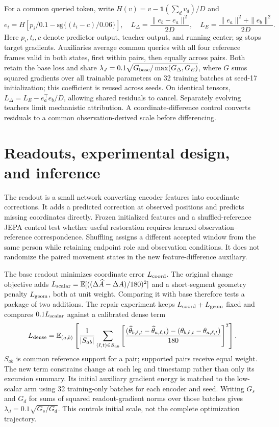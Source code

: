 \documentclass{article}
\begin{document}
For a common queried token, write $H(v)=v-\mathbf1(\sum_d v_d)/D$ and
\begin{equation}
e_i=H\left[p_i/0.1-\mathrm{sg}\{(t_i-c)/0.06\}\right],\quad
L_\Delta=\frac{\|e_b-e_a\|^2}{2D},\quad
L_E=\frac{\|e_a\|^2+\|e_b\|^2}{2D}.
\label{eq:feature}
\end{equation}
Here $p_i,t_i,c$ denote predictor output, teacher output, and running center; $\mathrm{sg}$ stops target gradients. Auxiliaries average common queries with all four reference frames valid in both states, first within pairs, then equally across pairs. Both retain the base loss and share $\lambda_J=0.1\sqrt{G_{\rm base}/\max(G_\Delta,G_E)}$, where $G$ sums squared gradients over all trainable parameters on 32 training batches at seed-17 initialization; this coefficient is reused across seeds. On identical tensors, $L_\Delta=L_E-e_a^\top e_b/D$, allowing shared residuals to cancel. Separately evolving teachers limit mechanistic attribution. A coordinate-difference control converts residuals to a common observation-derived scale before differencing.

\clearpage
\section{Readouts, experimental design, and inference}
The readout is a small network converting encoder features into coordinate corrections. It adds a predicted correction at observed positions and predicts missing coordinates directly. Frozen initialized features and a shuffled-reference JEPA control test whether useful restoration requires learned observation--reference correspondence. Shuffling assigns a different accepted window from the same person while retaining endpoint role and observation conditions. It does not randomize the paired movement states in the new feature-difference auxiliary.

The base readout minimizes coordinate error $L_{\rm coord}$. The original change objective adds $L_{\rm scalar}=\mathbb E[((\Delta\widehat A-\Delta A)/180)^2]$ and a short-segment geometry penalty $L_{\rm geom}$, both at unit weight. Comparing it with base therefore tests a package of two additions. The repair experiment keeps $L_{\rm coord}+L_{\rm geom}$ fixed and compares $0.1L_{\rm scalar}$ against a calibrated dense term
\begin{equation}
L_{\rm dense}=\mathbb E_{(a,b)}\left[\frac{1}{|S_{ab}|}\sum_{(\ell,t)\in S_{ab}}
\left[\frac{(\widehat\theta_{b,\ell,t}-\widehat\theta_{a,\ell,t})-(\theta_{b,\ell,t}-\theta_{a,\ell,t})}{180}\right]^2\right].
\end{equation}
$S_{ab}$ is common reference support for a pair; supported pairs receive equal weight. The new term constrains change at each leg and timestamp rather than only its excursion summary. Its initial auxiliary gradient energy is matched to the low-scalar arm using 32 training-only batches for each encoder and seed. Writing $G_s$ and $G_d$ for sums of squared readout-gradient norms over those batches gives $\lambda_d=0.1\sqrt{G_s/G_d}$. This controls initial scale, not the complete optimization trajectory.
\end{document}
